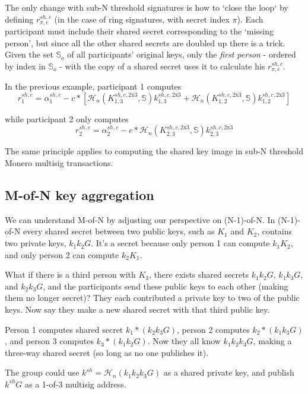The only change with sub-N threshold signatures is how to `close the loop` by defining $r^{sh,c}_{\pi,e}$ (in the case of ring signatures, with secret index $\pi$). Each participant must include their shared secret corresponding to the `missing person', but since all the other shared secrets are doubled up there is a trick. Given the set $\mathbb{S}_o$ of all participants' original keys, only the {\em first person} - ordered by index in $\mathbb{S}_o$ - with the copy of a shared secret uses it to calculate his $r^{sh,c}_{\pi,e}$. 

In the previous example, participant 1 computes 
\[ r^{sh,c}_1 = \alpha^{sh,c}_1 - c*[\mathcal{H}_n(K^{sh,c,\textrm{2x3}}_{1,3},\mathbb{S}) k^{sh,c,\textrm{2x3}}_{1,3} + \mathcal{H}_n(K^{sh,c,\textrm{2x3}}_{1,2},\mathbb{S}) k^{sh,c,\textrm{2x3}}_{1,2}]\] 

while participant 2 only computes
\[ r^{sh,c}_2 = \alpha^{sh,c}_2 - c*\mathcal{H}_n(K^{sh,c,\textrm{2x3}}_{2,3},\mathbb{S}) k^{sh,c,\textrm{2x3}}_{2,3} \]

The same principle applies to computing the shared key image in sub-N threshold Monero multisig transactions.


\subsection{M-of-N key aggregation}
\label{sec:m-of-n}

We can understand M-of-N by adjusting our perspective on (N-1)-of-N. In (N-1)-of-N every shared secret between two public keys, such as $K_1$ and $K_2$, contains two private keys, $k_1 k_2 G$. It's a secret because only person 1 can compute $k_1 K_2$, and only person 2 can compute $k_2 K_1$.

What if there is a third person with $K_3$, there exists shared secrets $k_1 k_2 G$, $k_1 k_3 G$, and $k_2 k_3 G$, and the participants send these public keys to each other (making them no longer secret)? They each contributed a private key to two of the public keys. Now say they make a new shared secret with that third public key.

Person 1 computes shared secret $k_1*(k_2 k_3 G)$, person 2 computes $k_2*(k_1 k_3 G)$, and person 3 computes $k_3*(k_1 k_2 G)$. Now they all know $k_1 k_2 k_3 G$, making a three-way shared secret (so long as no one publishes it).

The group could use $k^{sh} = \mathcal{H}_n(k_1 k_2 k_3 G)$ as a shared private key, and publish $k^{sh} G$ as a 1-of-3 multisig address.


